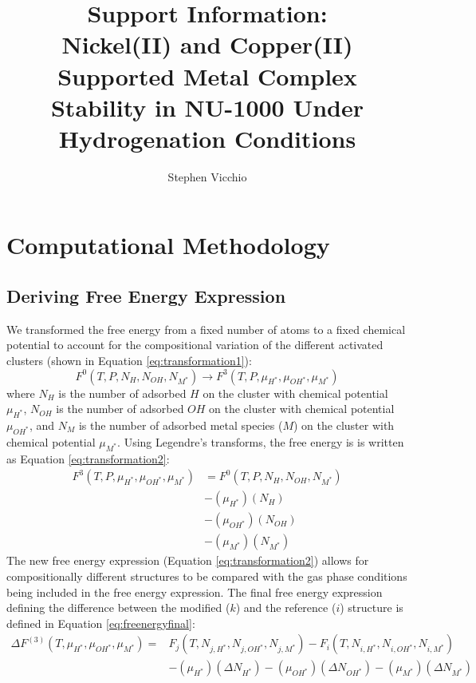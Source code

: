 \documentclass[12pt]{article}
\title{Support Information: \\
Nickel(II) and Copper(II) Supported Metal Complex Stability in NU-1000 Under Hydrogenation Conditions}
\author{Stephen Vicchio}
\begin{document}
\maketitle

\newpage
\tableofcontents

\newpage
\section{Computational Methodology}
\subsection{Deriving Free Energy Expression}
We transformed the free energy from a fixed number of atoms to a fixed chemical potential to account for the compositional variation of the different activated clusters (shown in Equation \ref{eq:transformation1}):
\begin{equation}
    F^{0}(T,P,N_{H},N_{OH},N_{M^{*}}) \rightarrow F^{3}(T,P,\mu_{H^{*}},\mu_{OH^{*}},\mu_{M^{*}})
    \label{eq:transformation1}
\end{equation}
where $N_{H}$ is the number of adsorbed $H$ on the cluster with chemical potential $\mu_{H^{*}}$, $N_{OH}$ is the number of adsorbed $OH$ on the cluster with chemical potential $\mu_{OH^{*}}$, and $N_{M}$ is the number of adsorbed metal species ($M$) on the cluster with chemical potential $\mu_{M^{*}}$. Using Legendre's transforms, the free energy is is written as Equation \ref{eq:transformation2}:
\begin{equation}
    \begin{split}
        F^{3}(T,P,\mu_{H^{*}},\mu_{OH^{*}},\mu_{M^{*}}) &= F^{0}(T,P,N_{H},N_{OH},N_{M^{*}}) \\ &- (\mu_{H^{*}})(N_{H}) \\ &- (\mu_{OH^{*}})(N_{OH}) \\ &- (\mu_{M^{*}})(N_{M^{*}})  
        \label{eq:transformation2}    
    \end{split}
\end{equation}
The new free energy expression (Equation \ref{eq:transformation2}) allows for compositionally different structures to be compared with the gas phase conditions being included in the free energy expression. The final free energy expression defining the difference between the modified ($k$) and the reference ($i$) structure is defined in Equation \ref{eq:freenergyfinal}:
\begin{equation}
    \begin{split}
        \Delta F^{(3)}(T,\mu_{H^{*}},\mu_{OH^{*}},\mu_{M^{*}})  = 
        & F_{j}(T,N_{j,H^{*}},N_{j,OH^{*}},N_{j,M^{*}}) - 
          F_{i}(T,N_{i,H^{*}},N_{i,OH^{*}},N_{i,M^{*}}) \\
        & - (\mu_{H^{*}})(\Delta N_{H^{*}}) - (\mu_{OH^{*}})(\Delta N_{OH^{*}}) - (\mu_{M^{*}})(\Delta N_{M^{*}}) \\ 
    \end{split}
    \label{eq:freenergyfinal}
\end{equation}
\end{document}
